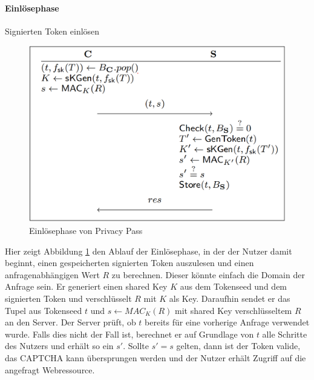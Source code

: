 \documentclass{scrreprt}
\begin{document}
\paragraph{Einlösephase} Signierten Token einlösen\\
\begin{figure}[H]
    \centering
    \includegraphics[width=0.5\linewidth]{pp-redemptionphase.png} 
    \caption{Einlösephase von Privacy Pass \cite{pp-davidson2018privacy}}
    \label{fig:pp-redemptoinphase}
\end{figure}
Hier zeigt Abbildung \ref{fig:pp-redemptoinphase} den Ablauf der Einlösephase, in der der Nutzer damit beginnt, einen gespeicherten signierten Token auszulesen und einen anfragenabhängigen Wert $R$ zu berechnen. Dieser könnte einfach die Domain der Anfrage sein. Er generiert einen shared Key $K$ aus dem Tokenseed und dem signierten Token und verschlüsselt $R$ mit $K$ als Key. Daraufhin sendet er das Tupel aus Tokenseed $t$ und $s\leftarrow MAC_{K}(R)$ mit shared Key verschlüsseltem $R$ an den Server. Der Server prüft, ob $t$ bereits für eine vorherige Anfrage verwendet wurde. Falls dies nicht der Fall ist, berechnet er auf Grundlage von $t$ alle Schritte des Nutzers und erhält so ein $s'$. Sollte $s'=s$ gelten, dann ist der Token valide, das CAPTCHA kann übersprungen werden und der Nutzer erhält Zugriff auf die angefragt Webressource.
\end{document}
